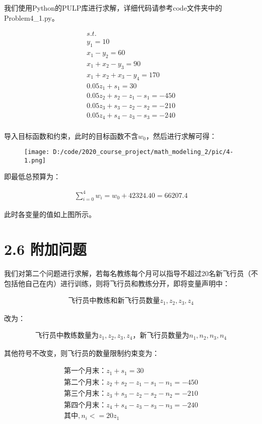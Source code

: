 \documentclass[bachelor,openany,oneside,color]{buaathesis}
\begin{document}
我们使用Python的PULP库进行求解，详细代码请参考code文件夹中的Problem4\_1.py。

\begin{gather*}s.t. \qquad\qquad\qquad\qquad \\y_1=10 \\x_1-y_2=60 \\x_1+x_2-y_3=90 \\x_1+x_2+x_3-y_4=170 \\0.05z_1+s_1=30\\0.05z_2+s_2-z_1-s_1=-450\\0.05z_3+s_3-z_2-s_2=-210\\0.05z_4+s_4-z_3-s_3=-240\\\end{gather*}

导入目标函数和约束，此时的目标函数不含\(w_0\)，然后进行求解可得：

\begin{figure}
\centering
\texttt{[image: D:/code/2020\_course\_project/math\_modeling\_2/pic/4-1.png]}
\caption{}
\end{figure}

即最低总预算为：

\begin{gather*}\sum_{i=0}^{4}w_i=w_0+42324.40=66207.4\end{gather*}

此时各变量的值如上图所示。

\hypertarget{header-n213}{%
\section{2.6 附加问题}\label{header-n213}}

我们对第二个问题进行求解，若每名教练每个月可以指导不超过20名新飞行员（不包括他自己在内）进行训练，则将飞行员和教练分开，即将变量声明中：

\begin{gather*}飞行员中教练和新飞行员数量z_1,z_2,z_3,z_4\end{gather*}

改为：

\begin{gather*}飞行员中教练数量为z_1,z_2,z_3,z_4，新飞行员数量为n_1,n_2,n_3,n_4\end{gather*}

其他符号不改变，则飞行员的数量限制约束变为：

\begin{gather*}第一个月末：z_1+s_1=30 \\第二个月末：z_2+s_2-z_1-s_1-n_1=-450 \\第三个月末：z_3+s_3-z_2-s_2-n_2=-210 \\第四个月末：z_4+s_4-z_3-s_3-n_3=-240 \\其中,n_i<=20z_1\end{gather*}
\end{document}
